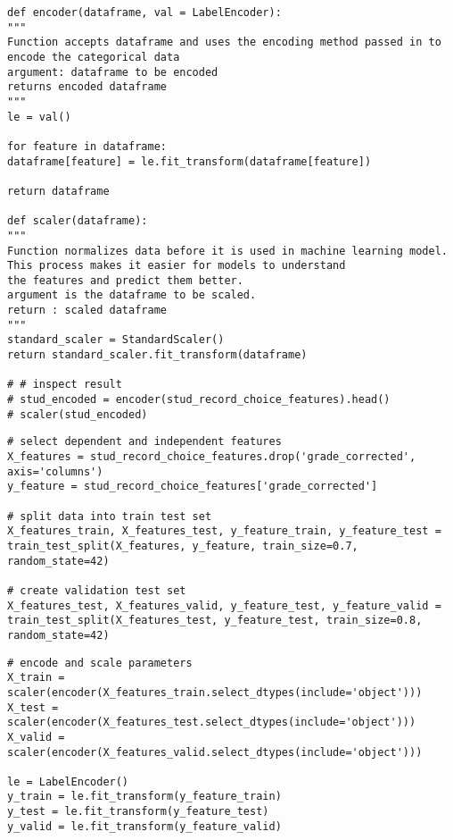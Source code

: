 \label{code:encoding_scaling}
\begin{verbatim}
def encoder(dataframe, val = LabelEncoder):
""" 
Function accepts dataframe and uses the encoding method passed in to encode the categorical data
argument: dataframe to be encoded
returns encoded dataframe
"""
le = val()

for feature in dataframe:
dataframe[feature] = le.fit_transform(dataframe[feature])

return dataframe 

def scaler(dataframe):
"""
Function normalizes data before it is used in machine learning model. This process makes it easier for models to understand
the features and predict them better.
argument is the dataframe to be scaled.
return : scaled dataframe 
"""
standard_scaler = StandardScaler()
return standard_scaler.fit_transform(dataframe)

# # inspect result
# stud_encoded = encoder(stud_record_choice_features).head()
# scaler(stud_encoded)
\end{verbatim}


\label{code:x_y}
\begin{verbatim}
# select dependent and independent features
X_features = stud_record_choice_features.drop('grade_corrected', axis='columns')
y_feature = stud_record_choice_features['grade_corrected']

# split data into train test set
X_features_train, X_features_test, y_feature_train, y_feature_test = train_test_split(X_features, y_feature, train_size=0.7, random_state=42)

# create validation test set
X_features_test, X_features_valid, y_feature_test, y_feature_valid = train_test_split(X_features_test, y_feature_test, train_size=0.8, random_state=42)
\end{verbatim}

\label{code:encoding_and_scaling}
\begin{verbatim}
# encode and scale parameters
X_train = scaler(encoder(X_features_train.select_dtypes(include='object')))
X_test = scaler(encoder(X_features_test.select_dtypes(include='object')))
X_valid = scaler(encoder(X_features_valid.select_dtypes(include='object')))

le = LabelEncoder()
y_train = le.fit_transform(y_feature_train)
y_test = le.fit_transform(y_feature_test) 
y_valid = le.fit_transform(y_feature_valid)
\end{verbatim}


